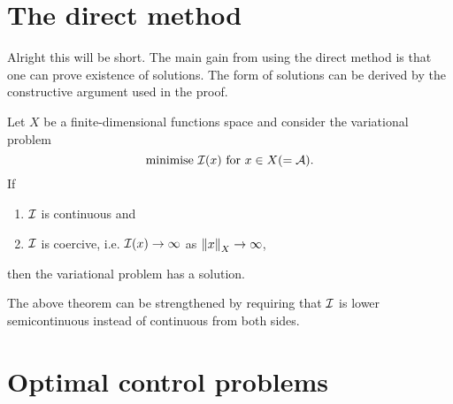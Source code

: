 \section{The direct method}

Alright this will be short. The main gain from using the direct method is that
one can prove existence of solutions. The form of solutions can be derived by
the constructive argument used in the proof.

\begin{thm}

  Let $X$ be a finite-dimensional functions space and consider the variational problem
  \[
    \text{minimise } \mathcal{I}(x) \text{ for } x \in X (= \mathcal{A}).
  \]
  If
  \begin{enumerate}
    \item $\mathcal{I}$ is continuous and
    \item $\mathcal{I}$ is coercive, i.e. $\mathcal{I}(x) \to \infty$ as $\left\Vert{x}\right\Vert_X \to \infty$,
  \end{enumerate}
  then the variational problem has a solution.
\end{thm}

\begin{remark}
  The above theorem can be strengthened by requiring that $\mathcal{I}$ is lower
  semicontinuous instead of continuous from both sides.
\end{remark}

\section{Optimal control problems}

